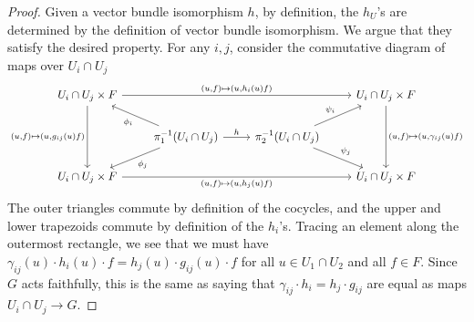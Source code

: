 \documentclass[11pt]{book}
\begin{document}
\begin{proof} Given a vector bundle isomorphism $h$, by definition, the $h_U$'s are determined by the definition of vector bundle isomorphism. We argue that they satisfy the desired property. For any $i,j$, consider the commutative diagram of maps over $U_i \cap U_j$
\[\begin{tikzcd}
    U_i \cap U_j \times F\ar[rrr,"{(u,f) \mapsto (u,h_i(u)f)}" above]\ar[dd,"{(u,f)\mapsto (u,g_{ij}(u)f)}" left] &  &  & U_i \cap U_j \times F\ar[dd,"{(u,f)\mapsto (u,\gamma_{ij}(u)f)}" right]\\
     & \pi_1^{-1}(U_i \cap U_j)\rar["h"]\ar[ul,"\phi_i"]\ar[dl,"\phi_j"] & \pi_2^{-1}(U_i \cap U_j)\ar[ur,"\psi_i" above left]\ar[dr,"\psi_j"] & \\
    U_i \cap U_j \times F\ar[rrr,"{(u,f) \mapsto (u,h_j(u)f)}" below] &  &  & U_i \cap U_j \times F
\end{tikzcd} \]
The outer triangles commute by definition of the cocycles, and the upper and lower trapezoids commute by definition of the $h_i$'s. Tracing an element along the outermost rectangle, we see that we must have $\gamma_{ij}(u)\cdot h_i(u) \cdot f = h_j(u) \cdot g_{ij}(u)\cdot f$ for all $u\in U_1 \cap U_2$ and all $f\in F$. Since $G$ acts faithfully, this is the same as saying that $\gamma_{ij}\cdot h_i = h_j \cdot g_{ij}$ are equal as maps $U_i \cap U_j \to G$.


\end{proof}
\end{document}
